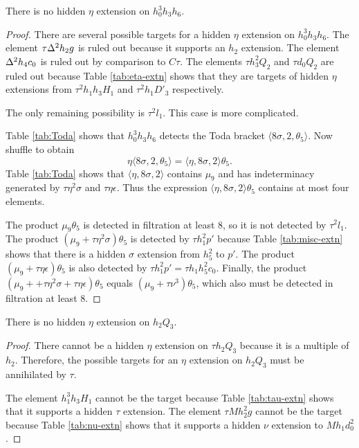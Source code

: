 \begin{lemma}
\label{lem:eta-h0^3h3h6}
There is no hidden $\eta$ extension on $h_0^3 h_3 h_6$.
\end{lemma}

\begin{proof}
There are several possible targets for a hidden
$\eta$ extension on $h_0^3 h_3 h_6$.
The element $\tau \Delta^2 h_2 g$ is ruled out
because it supports an $h_2$ extension.
The element $\Delta^2 h_4 c_0$ is ruled out by comparison to $C\tau$.
The elements $\tau h_3^2 Q_2$ and $\tau d_0 Q_2$ are ruled out
because Table \ref{tab:eta-extn}
shows that they are targets of hidden $\eta$ extensions from
$\tau^2 h_1 h_3 H_1$ and $\tau^2 h_1 D'_3$ respectively.

The only remaining possibility is $\tau^2 l_1$.  This case is
more complicated.

Table \ref{tab:Toda} shows that $h_0^3 h_3 h_6$ detects the Toda bracket
$\langle 8\sigma, 2, \theta_5 \rangle$.
Now shuffle to obtain
\[
\eta \langle 8\sigma, 2, \theta_5 \rangle =
\langle \eta, 8 \sigma, 2 \rangle \theta_5.
\]
Table \ref{tab:Toda} shows that
$\langle \eta, 8 \sigma, 2 \rangle$ contains $\mu_9$
and has indeterminacy generated by
$\tau \eta^2 \sigma$ and $\tau \eta \epsilon$.
Thus the expression
$\langle \eta, 8 \sigma, 2 \rangle \theta_5$ contains
at most four elements.

The product $\mu_9 \theta_5$ is detected in filtration at least $8$,
so it is not detected by $\tau^2 l_1$.
The product $(\mu_9 + \tau \eta^2 \sigma) \theta_5$
is detected by $\tau h_1^2 p'$ because
Table \ref{tab:misc-extn}
shows that there is a hidden $\sigma$ extension
from $h_5^2$ to $p'$.
The product
$(\mu_9 + \tau \eta \epsilon) \theta_5$ is also 
detected by $\tau h_1^2 p' = \tau h_1 h_5^2 c_0$.
Finally, the product
$(\mu_9 + +\tau \eta^2 \sigma + \tau \eta \epsilon) \theta_5$
equals $(\mu_9 + \tau \nu^3) \theta_5$, which also
must be detected in filtration at least $8$. 
\end{proof}

\begin{lemma}
\label{lem:eta-h2Q3}
There is no hidden $\eta$ extension on $h_2 Q_3$.
\end{lemma}

\begin{proof}
There cannot be a hidden $\eta$ extension on $\tau h_2 Q_3$
because it is a multiple of $h_2$.  Therefore, the possible
targets for an $\eta$ extension on $h_2 Q_3$ must be annihilated
by $\tau$.

The element $h_1^3 h_3 H_1$ cannot be the target because
Table \ref{tab:tau-extn} shows that it supports a hidden
$\tau$ extension.
The element $\tau M h_2^2 g$ cannot be the target because
Table \ref{tab:nu-extn} shows that it supports a hidden
$\nu$ extension to $M h_1 d_0^2$.
\end{proof}

